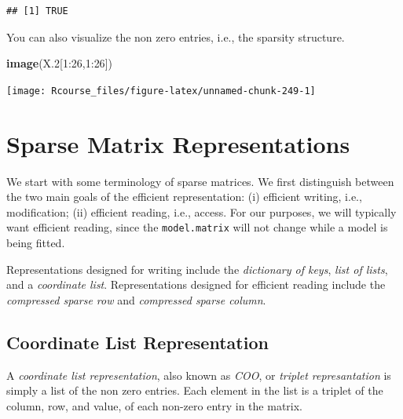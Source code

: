 \documentclass[]{book}
\newenvironment{Shaded}{\begin{snugshade}}{\end{snugshade}}
\newcommand{\KeywordTok}[1]{\textcolor[rgb]{0.13,0.29,0.53}{\textbf{{#1}}}}
\newcommand{\DataTypeTok}[1]{\textcolor[rgb]{0.13,0.29,0.53}{{#1}}}
\newcommand{\DecValTok}[1]{\textcolor[rgb]{0.00,0.00,0.81}{{#1}}}
\newcommand{\FloatTok}[1]{\textcolor[rgb]{0.00,0.00,0.81}{{#1}}}
\newcommand{\NormalTok}[1]{{#1}}
\theoremstyle{definition}
\theoremstyle{definition}
\theoremstyle{remark}
\begin{document}
\begin{Shaded}
\end{Shaded}

\begin{verbatim}
## [1] TRUE
\end{verbatim}

You can also visualize the non zero entries, i.e., the sparsity
structure.

\begin{Shaded}
\begin{Highlighting}[]
\KeywordTok{image}\NormalTok{(X}\FloatTok{.2}\NormalTok{[}\DecValTok{1}\NormalTok{:}\DecValTok{26}\NormalTok{,}\DecValTok{1}\NormalTok{:}\DecValTok{26}\NormalTok{])}
\end{Highlighting}
\end{Shaded}

\texttt{[image: Rcourse\_files/figure-latex/unnamed-chunk-249-1]}

\section{Sparse Matrix
Representations}\label{sparse-matrix-representations}

We start with some terminology of sparse matrices. We first distinguish
between the two main goals of the efficient representation: (i)
efficient writing, i.e., modification; (ii) efficient reading, i.e.,
access. For our purposes, we will typically want efficient reading,
since the \texttt{model.matrix} will not change while a model is being
fitted.

Representations designed for writing include the \emph{dictionary of
keys}, \emph{list of lists}, and a \emph{coordinate list}.
Representations designed for efficient reading include the
\emph{compressed sparse row} and \emph{compressed sparse column}.

\subsection{Coordinate List Representation}\label{coo}

A \emph{coordinate list representation}, also known as \emph{COO}, or
\emph{triplet represantation} is simply a list of the non zero entries.
Each element in the list is a triplet of the column, row, and value, of
each non-zero entry in the matrix.
\end{document}
